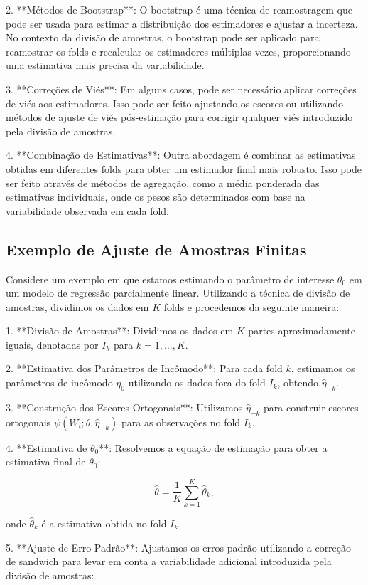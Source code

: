\documentclass[a4paper,12pt]{article}[abntex2]
\begin{document}
2. **Métodos de Bootstrap**: O bootstrap é uma técnica de reamostragem que pode ser usada para estimar a distribuição dos estimadores e ajustar a incerteza. No contexto da divisão de amostras, o bootstrap pode ser aplicado para reamostrar os folds e recalcular os estimadores múltiplas vezes, proporcionando uma estimativa mais precisa da variabilidade.

3. **Correções de Viés**: Em alguns casos, pode ser necessário aplicar correções de viés aos estimadores. Isso pode ser feito ajustando os escores ou utilizando métodos de ajuste de viés pós-estimação para corrigir qualquer viés introduzido pela divisão de amostras.

4. **Combinação de Estimativas**: Outra abordagem é combinar as estimativas obtidas em diferentes folds para obter um estimador final mais robusto. Isso pode ser feito através de métodos de agregação, como a média ponderada das estimativas individuais, onde os pesos são determinados com base na variabilidade observada em cada fold.

\subsection*{Exemplo de Ajuste de Amostras Finitas}

Considere um exemplo em que estamos estimando o parâmetro de interesse $\theta_0$ em um modelo de regressão parcialmente linear. Utilizando a técnica de divisão de amostras, dividimos os dados em $K$ folds e procedemos da seguinte maneira:

1. **Divisão de Amostras**: Dividimos os dados em $K$ partes aproximadamente iguais, denotadas por $I_k$ para $k=1, \ldots, K$.

2. **Estimativa dos Parâmetros de Incômodo**: Para cada fold $k$, estimamos os parâmetros de incômodo $\eta_0$ utilizando os dados fora do fold $I_k$, obtendo $\hat{\eta}_{-k}$.

3. **Construção dos Escores Ortogonais**: Utilizamos $\hat{\eta}_{-k}$ para construir escores ortogonais $\psi(W_i; \theta, \hat{\eta}_{-k})$ para as observações no fold $I_k$.

4. **Estimativa de $\theta_0$**: Resolvemos a equação de estimação para obter a estimativa final de $\theta_0$:

\[
\hat{\theta} = \frac{1}{K} \sum_{k=1}^K \hat{\theta}_k,
\]

onde $\hat{\theta}_k$ é a estimativa obtida no fold $I_k$.

5. **Ajuste de Erro Padrão**: Ajustamos os erros padrão utilizando a correção de sandwich para levar em conta a variabilidade adicional introduzida pela divisão de amostras:
\end{document}
